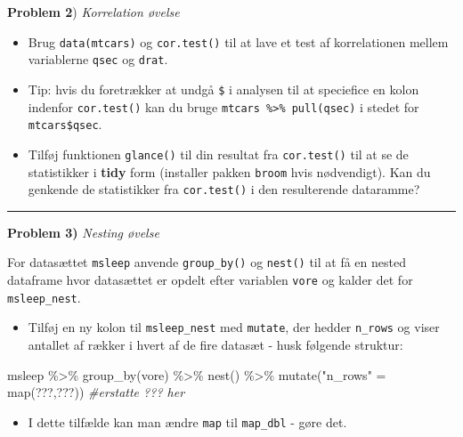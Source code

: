 \documentclass[
]{book}
\newenvironment{Shaded}{\begin{snugshade}}{\end{snugshade}}
\newcommand{\CommentTok}[1]{\textcolor[rgb]{0.56,0.35,0.01}{\textit{#1}}}
\newcommand{\FunctionTok}[1]{\textcolor[rgb]{0.00,0.00,0.00}{#1}}
\newcommand{\NormalTok}[1]{#1}
\newcommand{\OtherTok}[1]{\textcolor[rgb]{0.56,0.35,0.01}{#1}}
\newcommand{\SpecialCharTok}[1]{\textcolor[rgb]{0.00,0.00,0.00}{#1}}
\newcommand{\StringTok}[1]{\textcolor[rgb]{0.31,0.60,0.02}{#1}}
\providecommand{\tightlist}{%
  \setlength{\itemsep}{0pt}\setlength{\parskip}{0pt}}
\begin{document}
\textbf{Problem 2}) \emph{Korrelation øvelse}

\begin{itemize}
\item
  Brug \texttt{data(mtcars)} og \texttt{cor.test()} til at lave et test af korrelationen mellem variablerne \texttt{qsec} og \texttt{drat}.
\item
  Tip: hvis du foretrækker at undgå \texttt{\$} i analysen til at speciefice en kolon indenfor \texttt{cor.test()} kan du bruge \texttt{mtcars\ \%\textgreater{}\%\ pull(qsec)} i stedet for \texttt{mtcars\$qsec}.
\item
  Tilføj funktionen \texttt{glance()} til din resultat fra \texttt{cor.test()} til at se de statistikker i
  \textbf{tidy} form (installer pakken \texttt{broom} hvis nødvendigt). Kan du genkende de statistikker fra \texttt{cor.test()} i den resulterende dataramme?
\end{itemize}

\begin{center}\rule{0.5\linewidth}{0.5pt}\end{center}

\textbf{Problem 3)} \emph{Nesting øvelse}

For datasættet \texttt{msleep} anvende \texttt{group\_by()} og \texttt{nest()} til at få en nested dataframe hvor datasættet er opdelt efter variablen \texttt{vore} og kalder det for \texttt{msleep\_nest}.

\begin{itemize}
\tightlist
\item
  Tilføj en ny kolon til \texttt{msleep\_nest} med \texttt{mutate}, der hedder \texttt{n\_rows} og viser antallet af rækker i hvert af de fire datasæt - husk følgende struktur:
\end{itemize}

\begin{Shaded}
\begin{Highlighting}[]
\NormalTok{msleep }\SpecialCharTok{\%\textgreater{}\%} 
  \FunctionTok{group\_by}\NormalTok{(vore) }\SpecialCharTok{\%\textgreater{}\%} 
  \FunctionTok{nest}\NormalTok{() }\SpecialCharTok{\%\textgreater{}\%}
  \FunctionTok{mutate}\NormalTok{(}\StringTok{"n\_rows"} \OtherTok{=} \FunctionTok{map}\NormalTok{(???,???)) }\CommentTok{\#erstatte ??? her}
\end{Highlighting}
\end{Shaded}

\begin{itemize}
\tightlist
\item
  I dette tilfælde kan man ændre \texttt{map} til \texttt{map\_dbl} - gøre det.
\end{itemize}
\end{document}
